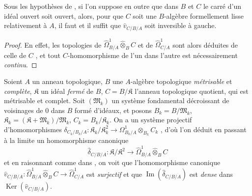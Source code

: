 \begin{corollary}[20.7.19]
\label{0.20.7.19-fr}
Sous les hypothèses de \textup{}, si l'on suppose en outre que dans
$B$ et $C$ le carré d'un idéal ouvert soit ouvert, alors, pour que $C$ soit
une $B$-algèbre formellement lisse relativement à $A$, il faut et il suffit
que $\widehat v_{C/B/A}$ soit inversible à gauche.
\end{corollary}

\begin{proof}
En effet, les topologies de
$\widehat{\Omega}^1_{B/A}\widehat\otimes_B C$ et de
$\widehat{\Omega}^1_{C/A}$ sont alors déduites de celle de $C$
, et tout $C$-homomorphisme de l'un dans l'autre est
nécessairement \emph{continu}.
\end{proof}

\begin{env}[20.7.20]
\label{0.20.7.20-fr}
Soient $A$ un anneau topologique, $B$ une $A$-algèbre topologique
\emph{métrisable} et \emph{complète}, $\mathfrak{K}$ un idéal \emph{fermé} de $B$,
$C=B/\mathfrak{K}$ l'anneau topologique quotient, qui est métrisable et
complet. Soit $(\mathfrak{M}_k)$ un système fondamental décroissant de
voisinages de $0$ dans $B$ formé d'idéaux, et posons
$B_k=B/\mathfrak{M}_k$,
$\mathfrak{K}_k=(\mathfrak{K}+\mathfrak{M}_k)/\mathfrak{M}_k$,
$C_k=B_k/\mathfrak{K}_k$. On a un système projectif d'homomorphismes
$\delta_{C_k/B_k/A}:\mathfrak{K}_k/\mathfrak{K}_k^2\to\Omega^1_{B_k/A}\otimes_{B_k}C_k$
, d'où l'on déduit en passant à la limite un
homomorphisme canonique
\[
  \widehat\delta_{C/B/A}:\mathfrak{K}/\mathfrak{K}^2\to
  \widehat{\Omega}^1_{B/A}\widehat\otimes_B C
\]
et en raisonnant comme dans , on voit que l'homomorphisme
canonique
$\widehat v_{C/B/A}:\widehat{\Omega}^1_{B/A}
\widehat\otimes_B C\to\widehat{\Omega}^1_{C/A}$ est
\emph{surjectif} et que $\operatorname{Im}(\widehat\delta_{C/B/A})$ est
\emph{dense} dans $\operatorname{Ker}(\widehat v_{C/B/A})$.
\end{env}
